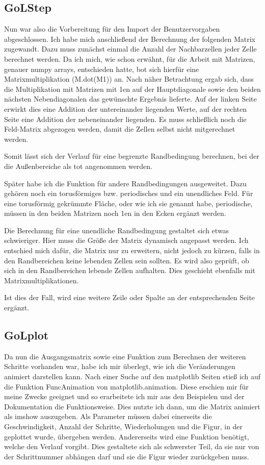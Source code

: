 \documentclass{scrartcl}
\begin{document}
\subsection{GoLStep}
Nun war also die Vorbereitung für den Import der Benutzervorgaben abgeschlossen. Ich habe mich anschließend der Berechnung der folgenden Matrix zugewandt. Dazu muss zunächst einmal die Anzahl der Nachbarzellen jeder Zelle berechnet werden. Da ich mich, wie schon erwähnt, für die Arbeit mit Matrizen, genauer numpy arrays, entschieden hatte, bot sich hierfür eine Matrixmultiplikation (M.dot(M1)) an. Nach näher Betrachtung ergab sich, dass die Multiplikation mit Matrizen mit 1en auf der Hauptdiagonale sowie den beiden nächsten Nebendiagonalen das gewünschte Ergebnis lieferte. Auf der linken Seite  erwirkt dies eine Addition der untereinander liegenden Werte, auf der rechten Seite eine Addition der nebeneinander liegenden. Es muss schließlich noch die Feld-Matrix abgezogen werden, damit die Zellen selbst nicht mitgerechnet werden.

Somit lässt sich der Verlauf für eine begrenzte Randbedingung berechnen, bei der die Außenbereiche als tot angenommen werden. 

Später habe ich die Funktion für andere Randbedingungen ausgeweitet. Dazu gehören noch ein torusförmiges bzw. periodisches und ein unendliches Feld.
Für eine torusförmig gekrümmte Fläche, oder wie ich sie genannt habe, periodische, müssen in den beiden Matrizen noch 1en in den Ecken ergänzt werden.

Die Berechnung für eine unendliche Randbedingung gestaltet sich etwas schwieriger. Hier muss die Größe der Matrix dynamisch angepasst werden. Ich entschied mich dafür, die Matrix nur zu erweitern, nicht jedoch zu kürzen, falls in den Randbereichen keine lebenden Zellen sein sollten. Es wird also geprüft, ob sich in den Randbereichen lebende Zellen aufhalten. Dies geschieht ebenfalls mit Matrixmultiplikationen. 

Ist dies der Fall, wird eine weitere Zeile oder Spalte an der entsprechenden Seite ergänzt.

\subsection{GoLplot}
Da nun die Ausgangsmatrix sowie eine Funktion zum Berechnen der weiteren Schritte vorhanden war, habe ich mir überlegt, wie ich die Veränderungen animiert darstellen kann. Nach einer Suche auf den matplotlib Seiten stieß ich auf die Funktion FuncAnimation von matplotlib.animation. Diese erschien mir für meine Zwecke geeignet und so erarbeitete ich mir aus den Beispielen und der Dokumentation die Funktionsweise. Dies nutzte ich dann, um die Matrix animiert als imshow auszugeben. Als Parameter müssen dabei einerseits die Geschwindigkeit, Anzahl der Schritte, Wiederholungen und die Figur, in der geplottet wurde, übergeben werden. Andererseits wird eine Funktion benötigt, welche den Verlauf vorgibt. Dies gestaltete sich als schwerster Teil, da sie nur von der Schrittnummer abhängen darf und sie die Figur wieder zurückgeben muss.
\end{document}
